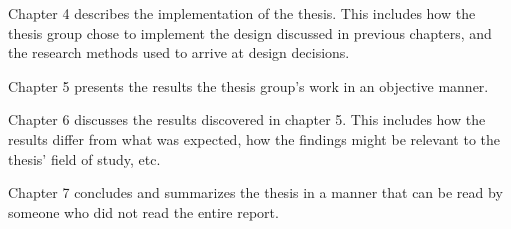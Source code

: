 Chapter 4 describes the implementation of the thesis.
This includes how the thesis group chose to implement the design discussed in previous chapters, and the research methods used to arrive at design decisions.

Chapter 5 presents the results the thesis group's work in an objective manner.

Chapter 6 discusses the results discovered in chapter 5.
This includes how the results differ from what was expected, how the findings might be relevant to the thesis' field of study, etc.

Chapter 7 concludes and summarizes the thesis in a manner that can be read by someone who did not read the entire report.





